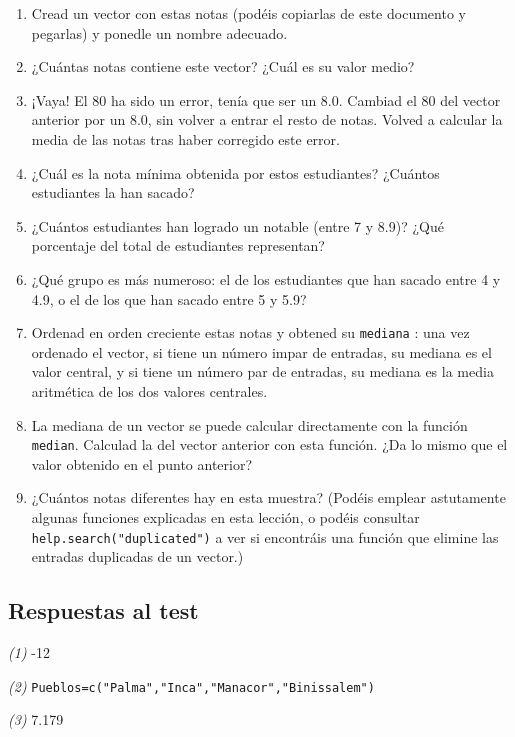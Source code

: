 \documentclass[]{book}
\providecommand{\tightlist}{%
  \setlength{\itemsep}{0pt}\setlength{\parskip}{0pt}}
\theoremstyle{definition}
\theoremstyle{definition}
\theoremstyle{definition}
\theoremstyle{remark}
\begin{document}
\begin{enumerate}
\def\labelenumi{\arabic{enumi}.}
\tightlist
\item
  Cread un vector con estas notas (podéis copiarlas de este documento y pegarlas) y ponedle un nombre adecuado.
\item
  ¿Cuántas notas contiene este vector? ¿Cuál es su valor medio?
\item
  ¡Vaya! El 80 ha sido un error, tenía que ser un 8.0. Cambiad el 80 del vector anterior por un 8.0, sin volver a entrar el resto de notas. Volved a calcular la media de las notas tras haber corregido este error.
\item
  ¿Cuál es la nota mínima obtenida por estos estudiantes? ¿Cuántos estudiantes la han sacado?
\item
  ¿Cuántos estudiantes han logrado un notable (entre 7 y 8.9)? ¿Qué porcentaje del total de estudiantes representan?
\item
  ¿Qué grupo es más numeroso: el de los estudiantes que han sacado entre 4 y 4.9, o el de los que han sacado entre 5 y 5.9?
\item
  Ordenad en orden creciente estas notas y obtened su \texttt{mediana} : una vez ordenado el vector, si tiene un número impar de entradas, su mediana es el valor central, y si tiene un número par de entradas, su mediana es la media aritmética de los dos valores centrales.
\item
  La mediana de un vector se puede calcular directamente con la función \texttt{median}.
  Calculad la del vector anterior con esta función.
  ¿Da lo mismo que el valor obtenido en el punto anterior?
\item
  ¿Cuántos notas diferentes hay en esta muestra? (Podéis emplear astutamente algunas funciones explicadas en esta lección, o podéis consultar \texttt{help.search("duplicated")} a ver si encontráis una función que elimine las entradas duplicadas de un vector.)
\end{enumerate}

\hypertarget{respuestas-al-test-1}{%
\subsection*{Respuestas al test}\label{respuestas-al-test-1}}

\emph{(1)} -12

\emph{(2)} \texttt{Pueblos=c("Palma","Inca","Manacor","Binissalem")}

\emph{(3)} 7.179
\end{document}
